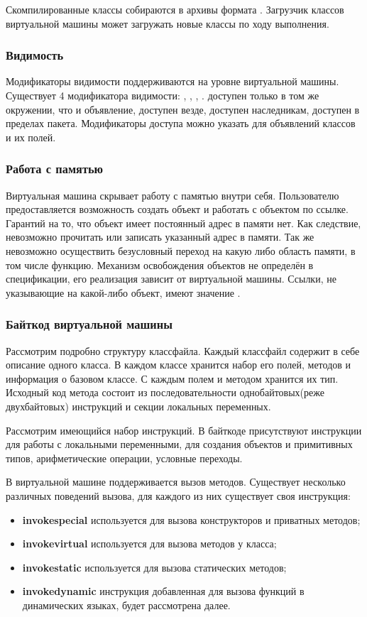 Скомпилированные классы собираются в архивы формата . Загрузчик классов виртуальной машины может загружать новые классы по ходу выполнения.

\subsubsection{Видимость}
Модификаторы видимости поддерживаются на уровне виртуальной машины. Существует 4 модификатора видимости: , , , .  доступен только в том же окружении, что и объявление,  доступен везде,  доступен наследникам,  доступен в пределах пакета. Модификаторы доступа можно указать для объявлений классов и их полей.

\subsubsection{Работа с памятью}
Виртуальная машина скрывает работу с памятью внутри себя. Пользователю предоставляется возможность создать объект и работать с объектом по ссылке. Гарантий на то, что объект имеет постоянный адрес в памяти нет. Как следствие, невозможно прочитать или записать указанный адрес в памяти. Так же невозможно осуществить безусловный переход на какую либо область памяти, в том числе функцию. Механизм освобождения объектов не определён в спецификации, его реализация зависит от виртуальной машины. Ссылки, не указывающие на какой-либо объект, имеют значение .

\subsubsection{Байткод виртуальной машины}
Рассмотрим подробно структуру классфайла. Каждый классфайл содержит в себе описание одного класса. В каждом классе хранится набор его полей, методов и информация о базовом классе. С каждым полем и методом хранится их тип. Исходный код метода состоит из последовательности однобайтовых(реже двухбайтовых) инструкций и секции локальных переменных.

Рассмотрим имеющийся набор инструкций. В байткоде присутствуют инструкции для работы с локальными переменными, для создания объектов и примитивных типов, арифметические операции, условные переходы.

В виртуальной машине поддерживается вызов методов. Существует несколько различных поведений вызова, для каждого из них существует своя инструкция:
\begin{itemize}
    \item \textbf{invokespecial} используется для вызова конструкторов и приватных методов;
    \item \textbf{invokevirtual} используется для вызова методов у класса;
    \item \textbf{invokestatic} используется для вызова статических методов;
    \item \textbf{invokedynamic} инструкция добавленная для вызова функций в динамических языках, будет рассмотрена далее.
\end{itemize}

